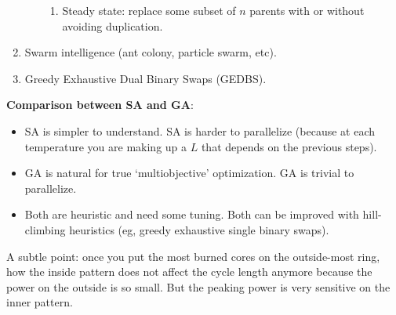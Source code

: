 \documentclass{school-22.211-notes}
\begin{document}
\begin{enumerate}
\begin{enumerate}
\begin{enumerate}
    \item Steady state: replace some subset of $n$ parents with or
      without avoiding duplication.
    \end{enumerate}
  \end{enumerate}


\item Swarm intelligence (ant colony, particle swarm, etc). 
\item Greedy Exhaustive Dual Binary Swaps (GEDBS). 
\end{enumerate}

\textbf{Comparison between SA and GA}: 

\begin{itemize}
\item SA is simpler to understand. SA is harder to parallelize (because
  at each temperature you are making up a $L$ that depends on the
  previous steps).

\item GA is natural for true `multiobjective' optimization. GA is
  trivial to parallelize.

\item Both are heuristic and need some tuning. Both can be improved
  with hill-climbing heuristics (eg, greedy exhaustive single binary
  swaps).
\end{itemize}

A subtle point: once you put the most burned cores on the outside-most
ring, how the inside pattern does not affect the cycle length anymore
because the power on the outside is so small. But the peaking power is
very sensitive on the inner pattern.



\clearpage
\end{document}
